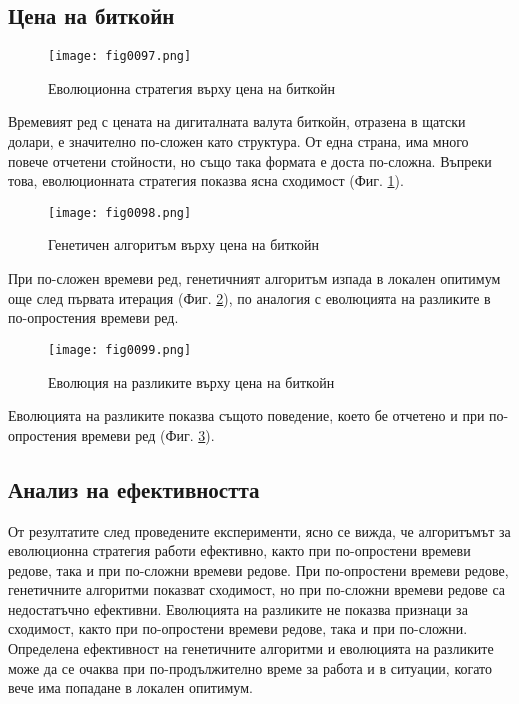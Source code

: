 \subsection{Цена на биткойн}

\begin{figure}[H]
  \centering
  \texttt{[image: fig0097.png]}
  \caption{Еволюционна стратегия върху цена на биткойн}
\label{fig0097}
\end{figure}

Времевият ред с цената на дигиталната валута биткойн, отразена в щатски долари, е значително по-сложен като структура. От една страна, има много повече отчетени стойности, но също така формата е доста по-сложна. Въпреки това, еволюционната стратегия показва ясна сходимост (Фиг. \ref{fig0097}).

\begin{figure}[H]
  \centering
  \texttt{[image: fig0098.png]}
  \caption{Генетичен алгоритъм върху цена на биткойн}
\label{fig0098}
\end{figure}

При по-сложен времеви ред, генетичният алгоритъм изпада в локален опитимум още след първата итерация (Фиг. \ref{fig0098}), по аналогия с еволюцията на разликите в по-опростения времеви ред.

\begin{figure}[H]
  \centering
  \texttt{[image: fig0099.png]}
  \caption{Еволюция на разликите върху цена на биткойн}
\label{fig0099}
\end{figure}

Еволюцията на разликите показва същото поведение, което бе отчетено и при по-опростения времеви ред (Фиг. \ref{fig0099}).

\subsection{Анализ на ефективността}

От резултатите след проведените експерименти, ясно се вижда, че алгоритъмът за еволюционна стратегия работи ефективно, както при по-опростени времеви редове, така и при по-сложни времеви редове. При по-опростени времеви редове, генетичните алгоритми показват сходимост, но при по-сложни времеви редове са недостатъчно ефективни. Еволюцията на разликите не показва признаци за сходимост, както при по-опростени времеви редове, така и при по-сложни. Определена ефективност на генетичните алгоритми и еволюцията на разликите може да се очаква при по-продължително време за работа и в ситуации, когато вече има попадане в локален опитимум. 

